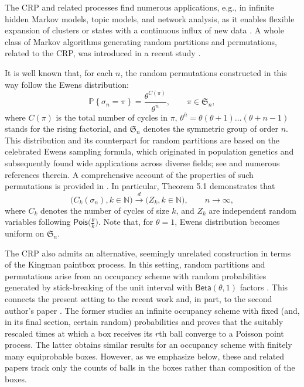 \documentclass[11pt]{article}
\newcommand{\N}{\mathbb{N}}
\renewcommand{\P}[1]{\mathbb{P}{\left\{#1\right\}}}
\newcommand{\1}[1][]{
	\ifx&#1&\mathds{1}
	\else\mathds{1}\left\{#1\right\}\fi}
\newcommand{\dto}{\overset{d}{\longrightarrow}}
\newcommand{\Sym}[1]{\mathfrak{S}_{#1}}
\theoremstyle{definition}
\theoremstyle{remark}
\numberwithin{equation}{section}
\begin{document}
	The CRP and related processes find numerous applications, e.g., in infinite hidden Markov models, topic models, and network analysis, 
	as it enables flexible expansion of clusters or states with a continuous influx of new data \cite{BGR01,TJBB06,FSJW11}.
	A whole class of Markov algorithms generating random partitions and permutations, related to the CRP, was introduced in a recent study \cite{S24}.
	
	It is well known that, for each $n$, the random permutations constructed in this way follow the Ewens distribution:
	\begin{equation*}
		\P{\sigma_n = \pi} = \frac{\theta^{C(\pi)}} {\theta^{\overline n}}, 
		\qquad \pi\in\Sym n,
	\end{equation*}
	where $C(\pi)$ is the total number of cycles in $\pi$, 
	$\theta^{\overline n}=\theta(\theta+1)\ldots(\theta+n-1)$ stands for the rising factorial, 
	and $\Sym n$ denotes the symmetric group of order $n$. 
	This distribution and its counterpart for random partitions are based on the celebrated Ewens sampling formula, 
	which originated in population genetics and subsequently found wide applications across diverse fields; see \cite{Cr16a,Cr16b} and numerous references therein. 
	A comprehensive account of the properties of such permutations is provided in \cite{ABT03}. In particular, Theorem 5.1 demonstrates that
	\begin{equation}
		\label{eq:ascc}
		\bigl(C_k(\sigma_n), k\in\N\bigr) \dto \bigl(Z_k, k\in\N\bigr), \qquad n\to\infty,
	\end{equation}
	where $C_k$ denotes the number of cycles of size $k$, and $Z_k$ are independent random variables following
	$\mathsf{Pois}\bigl(\frac{\theta}{k}\bigr)$. Note that, for $\theta=1$, Ewens distribution becomes uniform on $\Sym n$.
	
	The CRP also admits an alternative, seemingly unrelated construction in terms of the Kingman paintbox process. In this setting, random partitions and permutations arise from an occupancy scheme with random probabilities generated by stick-breaking of the unit interval with $\mathsf{Beta}(\theta,1)$ factors \cite{DJ91,G04,GIM12}. This connects the present setting to the recent work \cite{DGM24} and, in part, to the second author’s paper \cite{I19}. The former studies an infinite occupancy scheme with fixed (and, in its final section, certain random) probabilities and proves that the suitably rescaled times at which a box receives its $r$th ball converge to a Poisson point process. The latter obtains similar results for an occupancy scheme with finitely many equiprobable boxes. However, as we emphasize below, these and related papers track only the counts of balls in the boxes rather than composition of the boxes.
	
\end{document}
